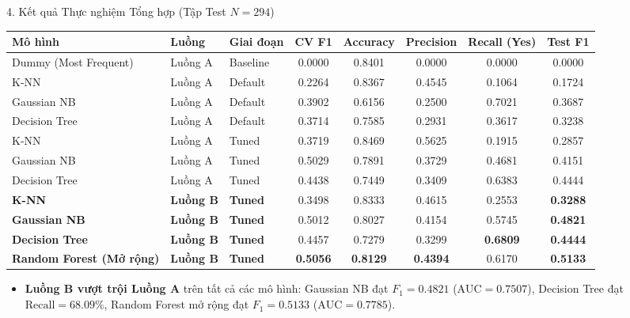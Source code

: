 \documentclass[aspectratio=169,10pt]{beamer}
\begin{document}
\begin{frame}{4. Kết quả Thực nghiệm Tổng hợp (Tập Test $N=294$)}
    \scriptsize
    \centering
    \begin{tabular}{l l l c c c c c}
        \toprule
        \textbf{Mô hình} & \textbf{Luồng} & \textbf{Giai đoạn} & \textbf{CV F1} & \textbf{Accuracy} & \textbf{Precision} & \textbf{Recall (Yes)} & \textbf{Test F1} \\
        \midrule
        Dummy (Most Frequent) & Luồng A & Baseline & 0.0000 & 0.8401 & 0.0000 & 0.0000 & 0.0000 \\
        K-NN & Luồng A & Default & 0.2264 & 0.8367 & 0.4545 & 0.1064 & 0.1724 \\
        Gaussian NB & Luồng A & Default & 0.3902 & 0.6156 & 0.2500 & 0.7021 & 0.3687 \\
        Decision Tree & Luồng A & Default & 0.3714 & 0.7585 & 0.2931 & 0.3617 & 0.3238 \\
        \midrule
        K-NN & Luồng A & Tuned & 0.3719 & 0.8469 & 0.5625 & 0.1915 & 0.2857 \\
        Gaussian NB & Luồng A & Tuned & 0.5029 & 0.7891 & 0.3729 & 0.4681 & 0.4151 \\
        Decision Tree & Luồng A & Tuned & 0.4438 & 0.7449 & 0.3409 & 0.6383 & 0.4444 \\
        \midrule
        \textbf{K-NN} & \textbf{Luồng B} & \textbf{Tuned} & 0.3498 & 0.8333 & 0.4615 & 0.2553 & \textbf{0.3288} \\
        \textbf{Gaussian NB} & \textbf{Luồng B} & \textbf{Tuned} & 0.5012 & 0.8027 & 0.4154 & 0.5745 & \textbf{0.4821} \\
        \textbf{Decision Tree} & \textbf{Luồng B} & \textbf{Tuned} & 0.4457 & 0.7279 & 0.3299 & \textbf{0.6809} & \textbf{0.4444} \\
        \textbf{Random Forest (Mở rộng)} & \textbf{Luồng B} & \textbf{Tuned} & \textbf{0.5056} & \textbf{0.8129} & \textbf{0.4394} & 0.6170 & \textbf{0.5133} \\
        \bottomrule
    \end{tabular}
    \vspace{0.2cm}
    \begin{itemize}
        \item \textbf{Luồng B vượt trội Luồng A} trên tất cả các mô hình: Gaussian NB đạt $F_1 = 0.4821$ ($\text{AUC}=0.7507$), Decision Tree đạt $\text{Recall} = 68.09\%$, Random Forest mở rộng đạt $F_1 = 0.5133$ ($\text{AUC}=0.7785$).
    \end{itemize}
\end{frame}
\end{document}
